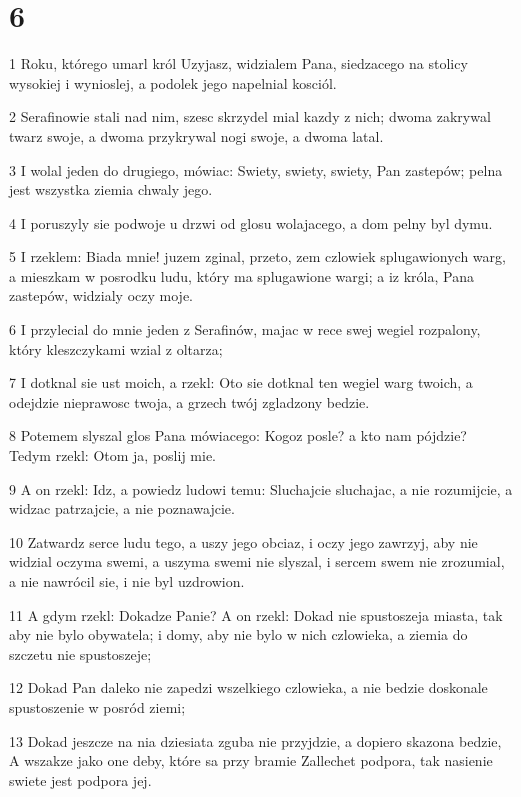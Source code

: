 \chapter{6}

\par 1 Roku, którego umarl król Uzyjasz, widzialem Pana, siedzacego na stolicy wysokiej i wynioslej, a podolek jego napelnial kosciól.
\par 2 Serafinowie stali nad nim, szesc skrzydel mial kazdy z nich; dwoma zakrywal twarz swoje, a dwoma przykrywal nogi swoje, a dwoma latal.
\par 3 I wolal jeden do drugiego, mówiac: Swiety, swiety, swiety, Pan zastepów; pelna jest wszystka ziemia chwaly jego.
\par 4 I poruszyly sie podwoje u drzwi od glosu wolajacego, a dom pelny byl dymu.
\par 5 I rzeklem: Biada mnie! juzem zginal, przeto, zem czlowiek splugawionych warg, a mieszkam w posrodku ludu, który ma splugawione wargi; a iz króla, Pana zastepów, widzialy oczy moje.
\par 6 I przylecial do mnie jeden z Serafinów, majac w rece swej wegiel rozpalony, który kleszczykami wzial z oltarza;
\par 7 I dotknal sie ust moich, a rzekl: Oto sie dotknal ten wegiel warg twoich, a odejdzie nieprawosc twoja, a grzech twój zgladzony bedzie.
\par 8 Potemem slyszal glos Pana mówiacego: Kogoz posle? a kto nam pójdzie? Tedym rzekl: Otom ja, poslij mie.
\par 9 A on rzekl: Idz, a powiedz ludowi temu: Sluchajcie sluchajac, a nie rozumijcie, a widzac patrzajcie, a nie poznawajcie.
\par 10 Zatwardz serce ludu tego, a uszy jego obciaz, i oczy jego zawrzyj, aby nie widzial oczyma swemi, a uszyma swemi nie slyszal, i sercem swem nie zrozumial, a nie nawrócil sie, i nie byl uzdrowion.
\par 11 A gdym rzekl: Dokadze Panie? A on rzekl: Dokad nie spustoszeja miasta, tak aby nie bylo obywatela; i domy, aby nie bylo w nich czlowieka, a ziemia do szczetu nie spustoszeje;
\par 12 Dokad Pan daleko nie zapedzi wszelkiego czlowieka, a nie bedzie doskonale spustoszenie w posród ziemi;
\par 13 Dokad jeszcze na nia dziesiata zguba nie przyjdzie, a dopiero skazona bedzie, A wszakze jako one deby, które sa przy bramie Zallechet podpora, tak nasienie swiete jest podpora jej.

